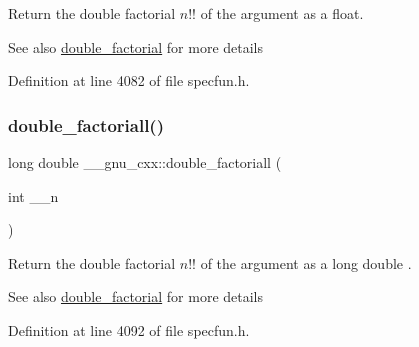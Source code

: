 Return the double factorial $ n!! $ of the argument as a {\ttfamily float}.

\begin{DoxySeeAlso}{See also}
\hyperlink{group__gnu__math__spec__func_ga1e62c47f84f9782828f8830b4fedc13c}{double\+\_\+factorial} for more details 
\end{DoxySeeAlso}


Definition at line 4082 of file specfun.\+h.

\mbox{\label{group__gnu__math__spec__func_ga0366730a4a775256217ef1cd9d0c3a04}} 
\subsubsection{\texorpdfstring{double\+\_\+factoriall()}{double\_factoriall()}}
{\footnotesize\ttfamily long double \+\_\+\+\_\+gnu\+\_\+cxx\+::double\+\_\+factoriall (\begin{DoxyParamCaption}\item[{int}]{\+\_\+\+\_\+n }\end{DoxyParamCaption})\hspace{0.3cm}{\ttfamily [inline]}}

Return the double factorial $ n!! $ of the argument as a {\ttfamily  long double }.

\begin{DoxySeeAlso}{See also}
\hyperlink{group__gnu__math__spec__func_ga1e62c47f84f9782828f8830b4fedc13c}{double\+\_\+factorial} for more details 
\end{DoxySeeAlso}


Definition at line 4092 of file specfun.\+h.

\mbox{\label{group__gnu__math__spec__func_ga6e44a0d90500e56ef4b3aba6efd7e2b0}} 
